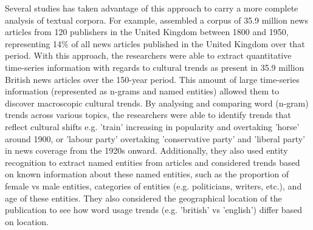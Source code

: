 \documentclass{report}
\begin{document}
Several studies has taken advantage of this approach to carry a more complete analysis of textual corpora. 
For example, \cite{lansdall2017content} assembled a corpus of 35.9 million news articles from 120 publishers in the United Kingdom between 1800 and 1950, representing 14\% of all news articles published in the United Kingdom over that period.
With this approach, the researchers were able to extract quantitative time-series information with regards to cultural trends as present in 35.9 million British news articles over the 150-year period.
This amount of large time-series information (represented as n-grams and named entities) allowed them to discover macroscopic cultural trends. 
By analysing and comparing word (n-gram) trends across various topics, the researchers were able to identify trends that reflect cultural shifts e.g. 'train' increasing in popularity and overtaking 'horse' around 1900, or 'labour party' overtaking 'conservative party' and 'liberal party' in news coverage from the 1920s onward.
Additionally, they also used entity recognition to extract named entities from articles and considered trends based on known information about these named entities, such as the proportion of female vs male entities, categories of entities (e.g. politicians, writers, etc.), and age of these entities.
They also considered the geographical location of the publication to see how word usage trends (e.g. 'british' vs 'english') differ based on location.
\end{document}
